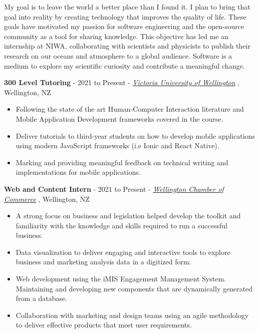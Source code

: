 \documentclass[9pt]{developercv}
\begin{document}
My goal is to leave the world a better place than I found it. I plan to bring that goal into reality by creating technology that improves the quality of life. These goals have motivated my passion for software engineering and the open-source community as a tool for sharing knowledge. This objective has led me an internship at NIWA, collaborating with scientists and physicists to publish their research on our oceans and atmosphere to a global audience. Software is a medium to explore my scientific curiosity and contribute a meaningful change.



\textbf{300 Level Tutoring} - 2021 to Present - \emph{\href{https://www.wgtn.ac.nz/}{Victoria University of Wellington}} , Wellington, NZ
\begin{itemize}
    \item Following the state of the art Human-Computer Interaction literature and Mobile Application Development frameworks covered in the course.
    \item Deliver tutorials to third-year students on how to develop mobile applications using modern JavaScript frameworks (i.e Ionic and React Native). 
    \item Marking and providing meaningful feedback on technical writing and implementations for mobile applications.
\end{itemize}

\textbf{Web and Content Intern} - 2021 to Present - \emph{\href{https://www.wecc.org.nz/}{Wellington Chamber of Commerce}} , Wellington, NZ
\begin{itemize}
    \item A strong focus on business and legislation helped develop the toolkit and familiarity with the knowledge and skills required to run a successful business.
    \item Data visualization to deliver engaging and interactive tools to explore business and marketing analysis data in a digitized form. 
    \item Web development using the iMIS Engagement Management System. Maintaining and developing new components that are dynamically generated from a database. 
    \item Collaboration with marketing and design teams using an agile methodology to deliver effective products that meet user requirements.
\end{itemize}
\end{document}
